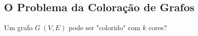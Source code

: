 \subsection{O Problema da Coloração de Grafos}
Um grafo $G\:(V,E)$ pode ser "colorido" com $k$ cores?

